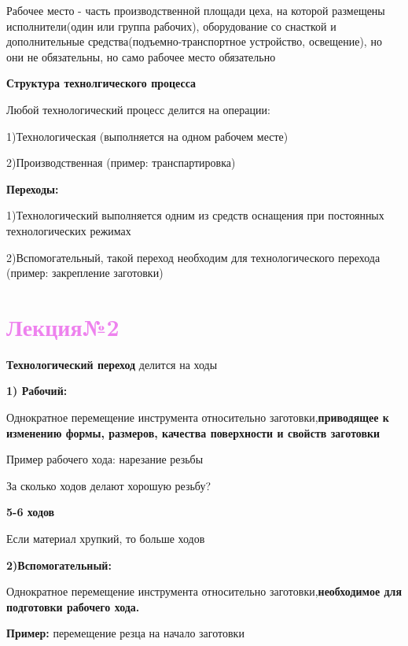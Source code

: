 {\begin{center}
     \par Рабочее место - часть производственной площади цеха, на которой размещены исполнители(один или группа рабочих), оборудование со снасткой и дополнительные средства(подъемно-транспортное устройство, освещение), но они не обязательны, но само рабочее место обязательно
     \par \textbf{Структура технолгического процесса}
     \par Любой технологический процесс делится на операции: 
     \par 1)Технологическая (выполняется на одном рабочем месте)
     \par 2)Производственная (пример: транспартировка)
     \par \textbf{Переходы:}
     \par 1)Технологический выполняется одним из средств оснащения при постоянных технологических режимах
     \par 2)Вспомогательный, такой переход необходим для технологического перехода (пример: закрепление заготовки)
\end{center}
\newpage

\Large\section*{\textcolor{violet}{Лекция№2}}
\begin{center}
    \par\textbf{Технологический переход} делится на ходы
    \par\textbf{1) Рабочий:}
    \par Однократное перемещение инструмента относительно заготовки,\textbf{приводящее к изменению формы, размеров, качества поверхности и свойств заготовки}
    \par * Пример рабочего хода: нарезание резьбы
    \par * За сколько ходов делают хорошую резьбу?
    \par\textbf{5-6 ходов}
    \par Если материал хрупкий, то больше ходов
    
    \par\textbf{2)Вспомогательный:}
    \par Однократное перемещение инструмента относительно заготовки,\textbf{необходимое для подготовки рабочего хода.}
    \par * \textbf{Пример:} перемещение резца на начало заготовки
    
    
    

\end{center}}

